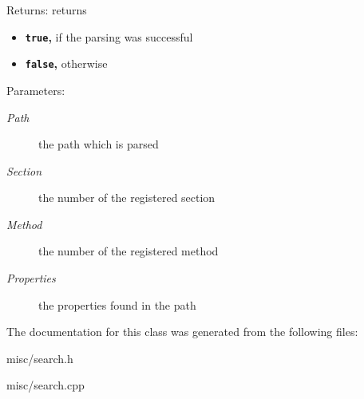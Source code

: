 \begin{Desc}
\item[Returns:]returns\begin{itemize}
\item {\bf {\tt true},} if the parsing was successful\item {\bf {\tt false},} otherwise \end{itemize}
\end{Desc}
\begin{Desc}
\item[Parameters:]
\begin{description}
\item[{\em Path}]the path which is parsed \item[{\em Section}]the number of the registered section \item[{\em Method}]the number of the registered method \item[{\em Properties}]the properties found in the path \end{description}
\end{Desc}


The documentation for this class was generated from the following files:\begin{CompactItemize}
\item 
misc/search.h\item 
misc/search.cpp\end{CompactItemize}
